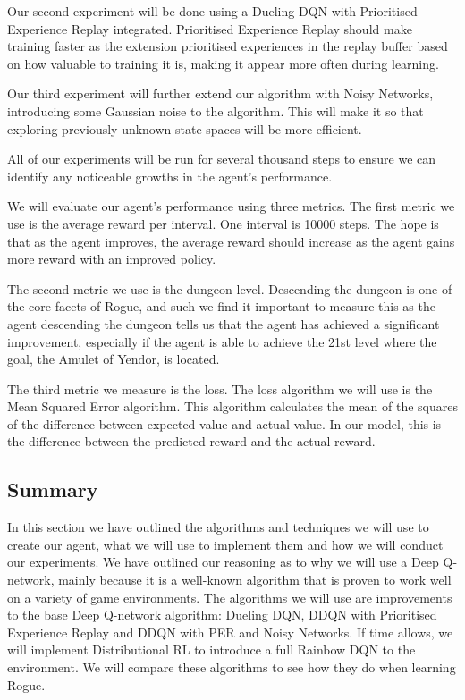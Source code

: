 \documentclass[12pt,a4paper]{article}
\begin{document}
    Our second experiment will be done using a Dueling DQN with Prioritised Experience Replay integrated.
    Prioritised Experience Replay should make training faster as the extension prioritised experiences in the replay
    buffer based on how valuable to training it is, making it appear more often during learning.

    Our third experiment will further extend our algorithm with Noisy Networks, introducing some Gaussian noise to the
    algorithm.
    This will make it so that exploring previously unknown state spaces will be more efficient.

    All of our experiments will be run for several thousand steps to ensure we can identify any noticeable growths
    in the agent's performance.

    We will evaluate our agent's performance using three metrics.
    The first metric we use is the average reward per interval.
    One interval is 10000 steps.
    The hope is that as the agent improves, the average reward should increase as the agent gains more reward with an improved policy.

    The second metric we use is the dungeon level.
    Descending the dungeon is one of the core facets of Rogue, and such we find it important to measure this as the agent descending the dungeon
    tells us that the agent has achieved a significant improvement, especially if the agent is able to achieve the 21st level where
    the goal, the Amulet of Yendor, is located.

    The third metric we measure is the loss.
    The loss algorithm we will use is the Mean Squared Error algorithm.
    This algorithm calculates the mean of the squares of the difference between expected value and actual value.
    In our model, this is the difference between the predicted reward and the actual reward. %


    \subsection{Summary}\label{subsec:summary2}
    In this section we have outlined the algorithms and techniques we will use to create our agent, what we will use to implement them and how we will conduct our experiments.
    We have outlined our reasoning as to why we will use a Deep Q-network, mainly because it is a well-known algorithm that is proven to work well on a variety of game environments.
    The algorithms we will use are improvements to the base Deep Q-network algorithm: Dueling DQN, DDQN with Prioritised Experience Replay and DDQN with PER and Noisy Networks.
    If time allows, we will implement Distributional RL to introduce a full Rainbow DQN to the environment.
    We will compare these algorithms to see how they do when learning Rogue.
\end{document}
